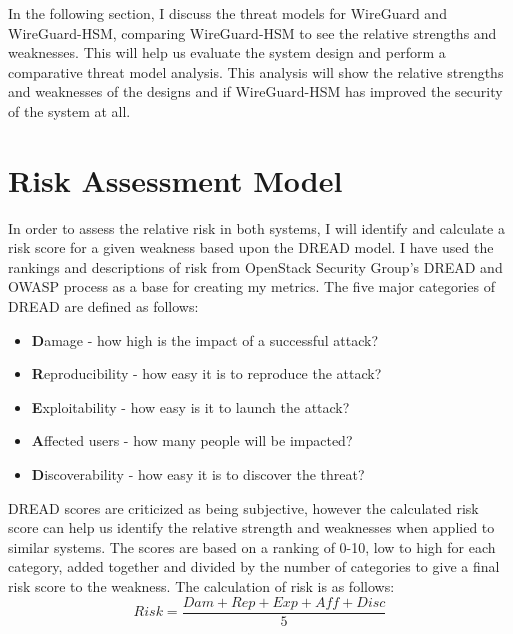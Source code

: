 \documentclass [11pt, proquest] {uwthesis}[2020/02/24]
\begin{document}
In the following section, I discuss the threat models for WireGuard and WireGuard-HSM, comparing WireGuard-HSM to see the relative strengths and weaknesses. This will help us evaluate the system design and perform a comparative threat model analysis. This analysis will show the relative strengths and weaknesses of the designs and if WireGuard-HSM has improved the security of the system at all.

\section{Risk Assessment Model}
In order to assess the relative risk in both systems, I will identify and calculate a risk score for a given weakness based upon the DREAD model. I have used the rankings and descriptions of risk from OpenStack Security Group's DREAD and OWASP process \cite{noauthor_securityossa-metrics_2022}\cite{noauthor_threat_2022} as a base for creating my metrics. The five major categories of DREAD are defined as follows:

\begin{itemize}
  \item \textbf{D}amage - how high is the impact of a successful attack?
  \item \textbf{R}eproducibility - how easy it is to reproduce the attack? 
  \item \textbf{E}xploitability - how easy is it to launch the attack?
  \item \textbf{A}ffected users - how many people will be impacted?
  \item \textbf{D}iscoverability - how easy it is to discover the threat?
\end{itemize}
\bigskip

\label{dread}
DREAD scores are criticized as being subjective, however the calculated risk score can help us identify the relative strength and weaknesses when applied to similar systems. The scores are based on a ranking of 0-10, low to high for each category, added together and divided by the number of categories to give a final risk score to the weakness. 
The calculation of risk is as follows:
\begin{equation}
Risk = \frac{Dam + Rep + Exp + Aff + Disc }{5}
\end{equation}

\end{document}
